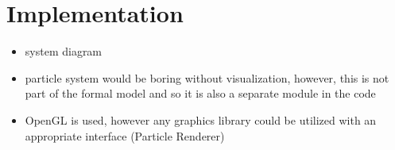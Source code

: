 \documentclass[runningheads,a4paper]{llncs}
\begin{document}
\section{Implementation}

\begin{itemize}
\item system diagram
\item particle system would be boring without visualization, however, this is not part of the formal model and so it is also a separate module in the code
\item OpenGL is used, however any graphics library could be utilized with an appropriate interface (Particle Renderer)
\end{itemize}

%







\end{document}
